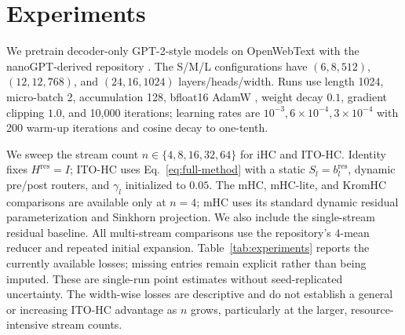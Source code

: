\documentclass{article}
\newcommand{\Hres}{H^{\mathrm{res}}}
\begin{document}
\section{Experiments}
\label{sec:experiments}

We pretrain decoder-only GPT-2-style models \citep{radford2019language} on OpenWebText \citep{gokaslan2019openwebtext} with the nanoGPT-derived repository \citep{karpathy2022nanogpt}. The S/M/L configurations have $(6,8,512)$, $(12,12,768)$, and $(24,16,1024)$ layers/heads/width. Runs use length 1024, micro-batch 2, accumulation 128, bfloat16 AdamW \citep{loshchilov2019decoupled}, weight decay $0.1$, gradient clipping $1.0$, and 10,000 iterations; learning rates are $10^{-3},6\times10^{-4},3\times10^{-4}$ with 200 warm-up iterations and cosine decay to one-tenth.

We sweep the stream count $n\in\{4,8,16,32,64\}$ for iHC and ITO-HC. Identity fixes $\Hres=I$; ITO-HC uses Eq.~\ref{eq:full-method} with a static $S_l=b_l^{\mathrm{res}}$, dynamic pre/post routers, and $\gamma_l$ initialized to $0.05$. The mHC, mHC-lite, and KromHC comparisons are available only at $n=4$; mHC uses its standard dynamic residual parameterization and Sinkhorn projection. We also include the single-stream residual baseline. All multi-stream comparisons use the repository's $4$-mean reducer and repeated initial expansion. Table~\ref{tab:experiments} reports the currently available losses; missing entries remain explicit rather than being imputed. These are single-run point estimates without seed-replicated uncertainty. The width-wise losses are descriptive and do not establish a general or increasing ITO-HC advantage as $n$ grows, particularly at the larger, resource-intensive stream counts.
\end{document}

